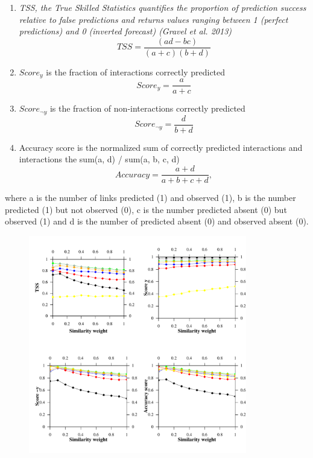 \documentclass[letterpaper]{article}
\begin{document}
 \begin{enumerate}
  \item \textit{TSS, the True Skilled Statistics quantifies the proportion of prediction success relative to false predictions and returns values ranging between 1 (perfect predictions) and 0 (inverted forecast) (Gravel et al. 2013)}
      \begin{equation}
        TSS = \frac{(ad - bc)}{(a + c)(b + d)}
      \end{equation}

  \item $Score_y$ is the fraction of interactions correctly predicted
      \begin{equation}
          Score_y = \frac{a}{a + c}
      \end{equation}

  \item $Score_{\neg y}$ is the fraction of non-interactions correctly predicted
      \begin{equation}
        Score_{\neg y}  = \frac{d}{b + d}
      \end{equation}

  \item Accuracy score is the normalized sum of correctly predicted interactions and interactions
  the sum(a, d) / sum(a, b, c, d)
      \begin{equation}
        Accuracy = \frac{a + d}{a + b + c + d},
      \end{equation}

 \end{enumerate}

 where a is the number of links predicted (1) and observed (1), b is the number predicted (1) but not observed (0), c is the number predicted absent (0) but observed (1) and d is the number of predicted absent (0) and observed absent (0).

 \begin{figure}
   \centering\includegraphics[width=0.85\textwidth]{results1.pdf}


 \end{figure}
\end{document}
